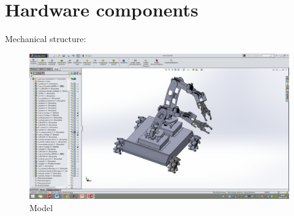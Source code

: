 \section{Hardware components}
\label{sec:hard}

Mechanical structure:

\begin{figure}[H]
\centering
\includegraphics[trim=21cm 5cm 18cm 5cm, clip=true, totalheight=0.5\textheight]{model}
\caption{Model}
\end{figure}

